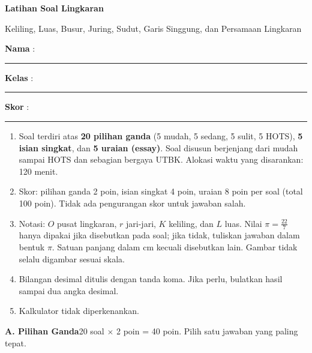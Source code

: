 \documentclass[a4paper,11pt]{article}
\newcounter{no}
\newcommand{\bagian}[2]{\par\Needspace{6\baselineskip}\vspace{1.0em}\noindent
  \begin{tcolorbox}[colback=redx,colframe=redx,coltext=white,boxrule=0pt,arc=2pt,left=6pt,right=6pt,top=3pt,bottom=3pt]
  \textbf{#1}\hfill{\small #2}\end{tcolorbox}\setcounter{no}{0}\par\vspace{-0.3em}}
\begin{document}
\thispagestyle{fancy}

\begin{center}
  {\color{redx}\fontsize{22}{26}\selectfont\bfseries Latihan Soal Lingkaran\par}
  \vspace{2pt}
  {\color{pinkx}\large Keliling, Luas, Busur, Juring, Sudut, Garis Singgung, dan Persamaan Lingkaran\par}
\end{center}
\vspace{2pt}
\begin{tcolorbox}[colback=softbg,colframe=redx!40,boxrule=0.6pt,arc=3pt,left=8pt,right=8pt,top=5pt,bottom=5pt]
\noindent\textbf{Nama} : \rule{4.6cm}{0.4pt}\hfill\textbf{Kelas} : \rule{2.2cm}{0.4pt}\hfill\textbf{Skor} : \rule{2.2cm}{0.4pt}
\end{tcolorbox}
\vspace{2pt}
\begin{tcolorbox}[colback=white,colframe=pinkx,boxrule=0.8pt,arc=3pt,left=8pt,right=8pt,top=4pt,bottom=4pt,title={\bfseries Petunjuk Pengerjaan},coltitle=white,fonttitle=\small]
\small
\begin{enumerate}[leftmargin=1.4em,itemsep=1pt,topsep=1pt]
\item Soal terdiri atas \textbf{20 pilihan ganda} (5 mudah, 5 sedang, 5 sulit, 5 HOTS), \textbf{5 isian singkat}, dan \textbf{5 uraian (essay)}. Soal disusun berjenjang dari mudah sampai HOTS dan sebagian bergaya UTBK. Alokasi waktu yang disarankan: 120 menit.
\item Skor: pilihan ganda 2 poin, isian singkat 4 poin, uraian 8 poin per soal (total 100 poin). Tidak ada pengurangan skor untuk jawaban salah.
\item Notasi: $O$ pusat lingkaran, $r$ jari-jari, $K$ keliling, dan $L$ luas. Nilai $\pi=\frac{22}{7}$ hanya dipakai jika disebutkan pada soal; jika tidak, tuliskan jawaban dalam bentuk $\pi$. Satuan panjang dalam cm kecuali disebutkan lain. Gambar tidak selalu digambar sesuai skala.
\item Bilangan desimal ditulis dengan tanda koma. Jika perlu, bulatkan hasil sampai dua angka desimal.
\item Kalkulator tidak diperkenankan.
\end{enumerate}
\end{tcolorbox}

\bagian{A. Pilihan Ganda}{20 soal $\times$ 2 poin = 40 poin. Pilih satu jawaban yang paling tepat.}
\end{document}
